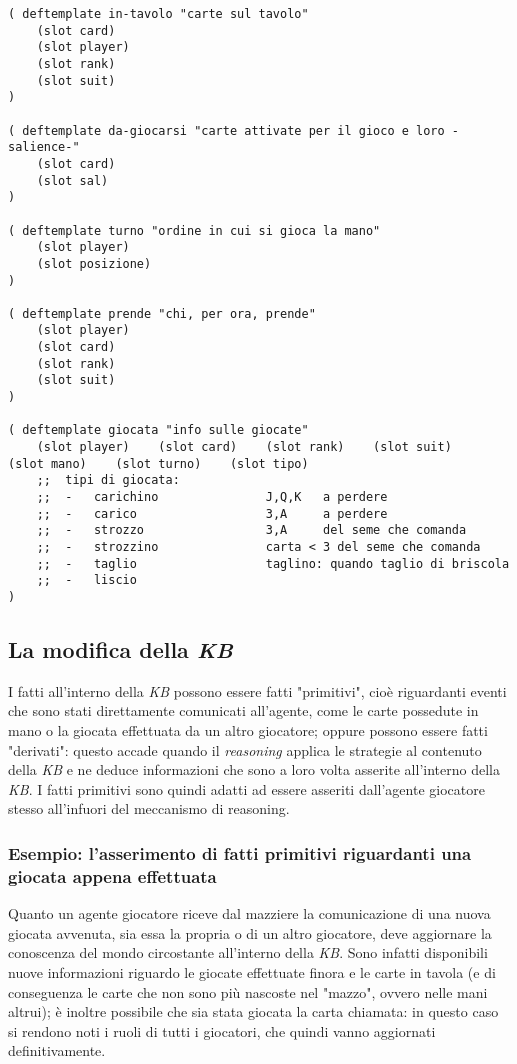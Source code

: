 \begin{lstlisting}[caption={Alcuni template di fatti la cui validità è limitata alla giocata corrente}, label=fattidiMano]
( deftemplate in-tavolo "carte sul tavolo"
    (slot card)
    (slot player)
    (slot rank)
    (slot suit)
)

( deftemplate da-giocarsi "carte attivate per il gioco e loro -salience-"
    (slot card)
    (slot sal)
)

( deftemplate turno "ordine in cui si gioca la mano"
    (slot player)
    (slot posizione)
)

( deftemplate prende "chi, per ora, prende"
    (slot player)
    (slot card)
    (slot rank)
    (slot suit)
)

( deftemplate giocata "info sulle giocate"
    (slot player)    (slot card)    (slot rank)    (slot suit)    (slot mano)    (slot turno)    (slot tipo)
    ;;  tipi di giocata:
    ;;  -   carichino               J,Q,K   a perdere
    ;;  -   carico                  3,A     a perdere
    ;;  -   strozzo                 3,A     del seme che comanda
    ;;  -   strozzino               carta < 3 del seme che comanda
    ;;  -   taglio                  taglino: quando taglio di briscola
    ;;  -   liscio
)
\end{lstlisting}




\subsection{La modifica della \emph{KB}}

I fatti all'interno della \emph{KB} possono essere fatti "primitivi", cioè riguardanti eventi che sono stati direttamente comunicati all'agente, come le carte possedute in mano o la giocata effettuata da un altro giocatore; oppure possono essere fatti "derivati": questo accade quando il \emph{reasoning} applica le strategie al contenuto della \emph{KB} e ne deduce informazioni che sono a loro volta asserite all'interno della \emph{KB}.
I fatti primitivi sono quindi adatti ad essere asseriti dall'agente giocatore stesso all'infuori del meccanismo di reasoning.

\subsubsection*{Esempio: l'asserimento di fatti primitivi riguardanti una giocata appena effettuata}

Quanto un agente giocatore riceve dal mazziere la comunicazione di una nuova giocata avvenuta, sia essa la propria o di un altro giocatore, deve aggiornare la conoscenza del mondo circostante all'interno della \emph{KB}.
Sono infatti disponibili nuove informazioni riguardo le giocate effettuate finora e le carte in tavola (e di conseguenza le carte che non sono più nascoste nel "mazzo", ovvero nelle mani altrui); è inoltre possibile che sia stata giocata la carta chiamata: in questo caso si rendono noti i ruoli di tutti i giocatori, che quindi vanno aggiornati definitivamente.



